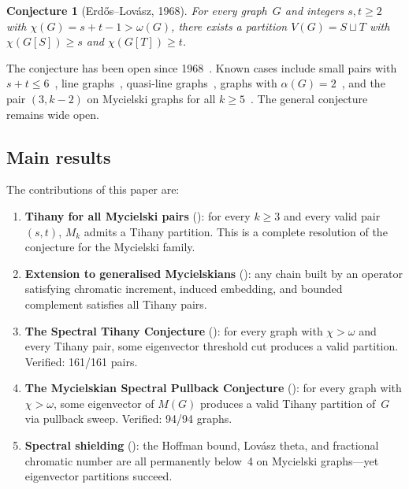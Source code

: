 \documentclass[11pt]{amsart}
\newtheorem{conjecture}[theorem]{Conjecture}
\theoremstyle{definition}
\theoremstyle{remark}
\begin{document}
\begin{conjecture}[Erd\H{o}s--Lov\'asz, 1968]\label{conj:tihany}
For every graph~$G$ and integers $s, t \ge 2$ with 
$\chi(G) = s + t - 1 > \omega(G)$, there exists a partition 
$V(G) = S \sqcup T$ with $\chi(G[S]) \ge s$ and $\chi(G[T]) \ge t$.
\end{conjecture}

The conjecture has been open since 1968~\cite{erdos-lovasz-1975}.  
Known cases include small pairs with $s + t \le 6$~\cite{stiebitz-1987, 
sachs-1993}, line graphs~\cite{kostochka-stiebitz-2003}, quasi-line 
graphs~\cite{chudnovsky-fradkin-2008}, graphs with 
$\alpha(G) = 2$~\cite{balogh-etal-2009}, and the pair $(3, k{-}2)$ 
on Mycielski graphs for all $k \ge 5$~\cite{santos-golden-2026}.  
The general conjecture remains wide open.

\subsection{Main results}

The contributions of this paper are:
\begin{enumerate}[label=(\arabic*)]
\item \textbf{Tihany for all Mycielski pairs} (): 
  for every $k \ge 3$ and every valid pair $(s,t)$, $M_k$ admits a 
  Tihany partition.  This is a complete resolution of the conjecture 
  for the Mycielski family.

\item \textbf{Extension to generalised Mycielskians} 
  (): any chain built by an operator satisfying 
  chromatic increment, induced embedding, and bounded complement 
  satisfies all Tihany pairs.

\item \textbf{The Spectral Tihany Conjecture} (): 
  for every graph with $\chi > \omega$ and every Tihany pair, some 
  eigenvector threshold cut produces a valid partition.  
  Verified: 161/161 pairs.

\item \textbf{The Mycielskian Spectral Pullback Conjecture} 
  (): for every graph with $\chi > \omega$, some 
  eigenvector of $M(G)$ produces a valid Tihany partition of~$G$ via 
  pullback sweep.  Verified: 94/94 graphs.

\item \textbf{Spectral shielding} (): the 
  Hoffman bound, Lov\'asz theta, and fractional chromatic number are 
  all permanently below~4 on Mycielski graphs---yet eigenvector 
  partitions succeed.
\end{enumerate}
\end{document}
